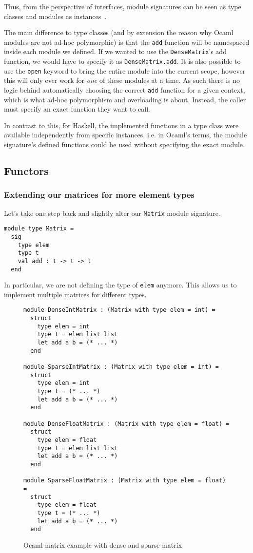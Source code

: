 Thus, from the perspective of interfaces, module signatures can be seen as type classes and modules as instances~\cite{modular-type-classes}.

The main difference to type classes (and by extension the reason why Ocaml modules are not ad-hoc polymorphic) is that the \verb|add| function will be namespaced inside each module we defined. If we wanted to use the \verb|DenseMatrix|'s add function, we would have to specify it as \verb|DenseMatrix.add|. It is also possible to use the \verb|open| keyword to bring the entire module into the current scope, however this will only ever work for \textit{one} of these modules at a time. As such there is no logic behind automatically choosing the correct \verb|add| function for a given context, which is what ad-hoc polymorphism and overloading is about. Instead, the caller must specify an exact function they want to call.

In contrast to this, for Haskell, the implemented functions in a type class were available independently from specific instances, i.e. in Ocaml's terms, the module signature's defined functions could be used without specifying the exact module.

\subsection{Functors}

\subsubsection{Extending our matrices for more element types}

Let's take one step back and slightly alter our \verb|Matrix| module signature.
\begin{verbatim}
module type Matrix =
  sig
    type elem
    type t
    val add : t -> t -> t
  end
\end{verbatim}
In particular, we are not defining the type of \verb|elem| anymore. This allows us to implement multiple matrices for different types.

\begin{figure*}
\begin{verbatim}
module DenseIntMatrix : (Matrix with type elem = int) =
  struct
    type elem = int
    type t = elem list list
    let add a b = (* ... *)
  end

module SparseIntMatrix : (Matrix with type elem = int) =
  struct
    type elem = int
    type t = (* ... *)
    let add a b = (* ... *)
  end

module DenseFloatMatrix : (Matrix with type elem = float) =
  struct
    type elem = float
    type t = elem list list
    let add a b = (* ... *)
  end

module SparseFloatMatrix : (Matrix with type elem = float) =
  struct
    type elem = float
    type t = (* ... *)
    let add a b = (* ... *)
  end
\end{verbatim}
\caption{Ocaml matrix example with dense and sparse matrix}
\label{ocaml-all-matrix}
\end{figure*}


